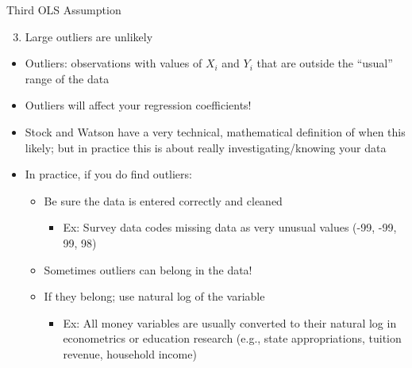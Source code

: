 \documentclass[8pt,ignorenonframetext,dvipsnames]{beamer}
\providecommand{\tightlist}{%
  \setlength{\itemsep}{0pt}\setlength{\parskip}{0pt}}
\let\olditem\item
\renewcommand{\item}{%
  \olditem\vspace{4pt}
}
\begin{document}
\begin{frame}{Third OLS Assumption}
\protect\hypertarget{third-ols-assumption}{}

\begin{enumerate}
\setcounter{enumi}{2}
\tightlist
\item
  Large outliers are unlikely
\end{enumerate}

\begin{itemize}
\tightlist
\item
  Outliers: observations with values of \(X_i\) and \(Y_i\) that are
  outside the ``usual'' range of the data
\item
  Outliers will affect your regression coefficients!
\item
  Stock and Watson have a very technical, mathematical definition of
  when this likely; but in practice this is about really
  investigating/knowing your data
\item
  In practice, if you do find outliers:

  \begin{itemize}
  \tightlist
  \item
    Be sure the data is entered correctly and cleaned

    \begin{itemize}
    \tightlist
    \item
      Ex: Survey data codes missing data as very unusual values (-99,
      -99, 99, 98)
    \end{itemize}
  \item
    Sometimes outliers can belong in the data!
  \item
    If they belong; use natural log of the variable

    \begin{itemize}
    \tightlist
    \item
      Ex: All money variables are usually converted to their natural log
      in econometrics or education research (e.g., state appropriations,
      tuition revenue, household income)
    \end{itemize}
  \end{itemize}
\end{itemize}

\end{frame}
\end{document}
